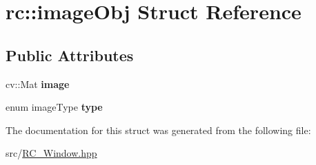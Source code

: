 \hypertarget{structrc_1_1imageObj}{\section{rc\+:\+:image\+Obj Struct Reference}
\label{structrc_1_1imageObj}
}
\subsection*{Public Attributes}
\begin{DoxyCompactItemize}
\item 
\hypertarget{structrc_1_1imageObj_ab0e4bbd77dcb10ec7f115fab9972305c}{cv\+::\+Mat {\bfseries image}}\label{structrc_1_1imageObj_ab0e4bbd77dcb10ec7f115fab9972305c}

\item 
\hypertarget{structrc_1_1imageObj_a74a6a931dfe3696d0062b1f55be935ff}{enum image\+Type {\bfseries type}}\label{structrc_1_1imageObj_a74a6a931dfe3696d0062b1f55be935ff}

\end{DoxyCompactItemize}


The documentation for this struct was generated from the following file\+:\begin{DoxyCompactItemize}
\item 
src/\hyperlink{RC__Window_8hpp}{R\+C\+\_\+\+Window.\+hpp}\end{DoxyCompactItemize}
